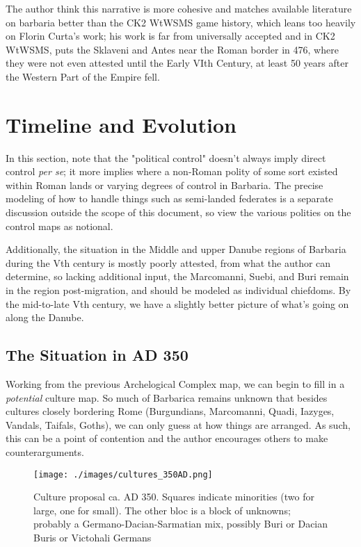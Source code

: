 \documentclass{article}
\begin{document}
	The author think this narrative is more cohesive and matches available literature on barbaria better than the CK2 WtWSMS game history, which leans too heavily on Florin Curta’s work; his work is far from universally accepted and in CK2 WtWSMS, puts the Sklaveni and Antes near the Roman border in 476, where they were not even attested until the Early VIth Century, at least 50 years after the Western Part of the Empire fell. 
	
	\section{Timeline and Evolution}
	\label{sec:timeline}
	
	In this section, note that the "political control" doesn't always imply direct control \textit{per se}; it more implies where a non-Roman polity of some sort existed within Roman lands or varying degrees of control in Barbaria.
	The precise modeling of how to handle things such as semi-landed federates is a separate discussion outside the scope of this document, so view the various polities on the control maps as notional.
	
	Additionally, the situation in the Middle and upper Danube regions of Barbaria during the Vth century is mostly poorly attested, from what the author can determine, so lacking additional input, the Marcomanni, Suebi, and Buri remain in the region post-migration, and should be modeled as individual chiefdoms. 
	By the mid-to-late Vth century, we have a slightly better picture of what's going on along the Danube.
	
	\subsection{The Situation in AD 350}
	\label{sec:timeline:subsec:350}
	
	Working from the previous Archelogical Complex map, we can begin to fill in a \textit{potential} culture map.
	So much of Barbarica remains unknown that besides cultures closely bordering Rome (Burgundians, Marcomanni, Quadi, Iazyges, Vandals, Taifals, Goths), we can only guess at how things are arranged.
	As such, this can be a point of contention and the author encourages others to make counterarguments.
	
	\begin{figure}[h!]
		\centering
		\texttt{[image: ./images/cultures\_350AD.png]}
		\caption{Culture proposal ca. AD 350. Squares indicate minorities (two for large, one for small).
			\newline\tiny The other bloc is a block of unknowns; probably a Germano-Dacian-Sarmatian mix, possibly Buri or Dacian Buris or Victohali Germans}
	\end{figure}
	
\end{document}
